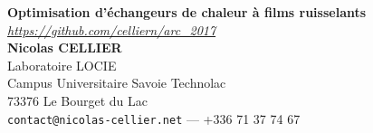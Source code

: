 \documentclass[a0,portrait]{a0poster}
\begin{document}


\begin{minipage}[b]{0.5\linewidth}
\veryHuge \color{NavyBlue} \textbf{Optimisation d'échangeurs de chaleur à films ruisselants} \color{Black}\\ %
\large \textit{\url{https://github.com/celliern/arc_2017}}\\[2cm] %

\huge \textbf{Nicolas CELLIER}\\[0.5cm] %
\huge Laboratoire LOCIE\\
Campus Universitaire Savoie Technolac\\
73376 Le Bourget du Lac\\[0.4cm] %
\Large \texttt{contact@nicolas-cellier.net} --- +336 71 37 74 67\\
\end{minipage}
%
\end{document}
